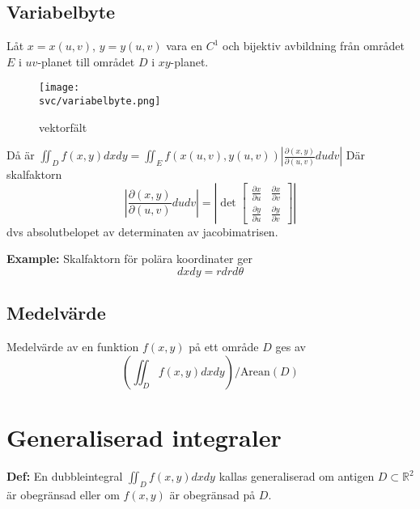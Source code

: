 
\subsection{Variabelbyte}
Låt $x = x(u,v)$, $y=y(u,v)$ vara en $C^1$ och bijektiv avbildning från
området $E$ i $uv$-planet till området $D$ i $xy$-planet.

\begin{figure}[H]
    \centering
    \texttt{[image: \\svc/variabelbyte.png]}
    \caption{vektorfält}
\end{figure}



Då är $\iint_D f(x,y)dxdy = \iint_E f(x(u,v), y(u,v))\left| \frac{\partial (x,y)}{\partial (u, v)}dudv\right|$
Där skalfaktorn 
\begin{equation*} 
    \left| \frac{\partial (x,y)}{\partial (u, v)}dudv\right| 
    = \left|\det\begin{bmatrix} \frac{\partial x}{\partial u} & \frac{\partial x}{\partial v} \\ \frac{\partial y}{\partial u} & \frac{\partial y}{\partial v} \end{bmatrix}\right|
\end{equation*} 
dvs absolutbelopet av determinaten av jacobimatrisen.

\textbf{Example:}
Skalfaktorn för polära koordinater ger 
\begin{equation*} 
    dxdy = rdrd\theta
\end{equation*} 

\subsection{Medelvärde}
Medelvärde av en funktion $f(x,y)$ på ett område $D$ ges av
\begin{equation*}
    \left( \iint_D f(x,y)dxdy \right) / \text{Arean}(D) 
\end{equation*}


\section{Generaliserad integraler}
\textbf{Def:} En dubbleintegral $\iint_D f(x,y)dxdy$ kallas 
generaliserad om antigen $D\subset\mathbb{R}^2$ är obegränsad 
eller om $f(x,y)$ är obegränsad på $D$.

